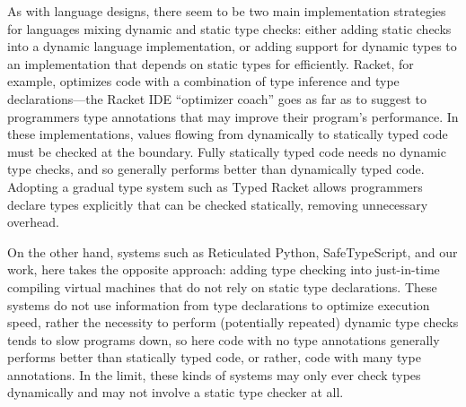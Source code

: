 As with language designs, there seem to be two main implementation
strategies for languages mixing dynamic and static type checks: either
adding static checks into a dynamic language implementation, or adding
support for dynamic types to an implementation that depends on
static types for efficiently. Racket, for example, optimizes code with
a combination of type inference and type declarations---the Racket
IDE ``optimizer coach'' goes as far as to suggest to programmers type
annotations that may improve their program's performance\citep{optimizerCoach2012}. In these implementations, values flowing
from dynamically to statically typed code must be checked at the
boundary.  Fully statically typed code needs no dynamic type checks,
and so generally performs better than dynamically typed code. Adopting
a gradual type system such as Typed Racket\citep{typedScheme08} allows
programmers declare types explicitly that can be checked statically,
removing unnecessary overhead.

On the other hand, systems such as Reticulated Python\citep{reticPython2014}, SafeTypeScript\citep{Richards2017}, and our
work, here takes the opposite approach: adding type checking into
just-in-time compiling virtual machines that do not rely on static
type declarations. These systems do not use information from type
declarations to optimize execution speed, rather the necessity to
perform (potentially repeated) dynamic type checks tends to slow
programs down, so here code with no type annotations generally
performs better than statically typed code, or rather, code with many
type annotations. In the limit, these kinds of systems may only ever
check types dynamically and may not involve a static type checker at
all. 

